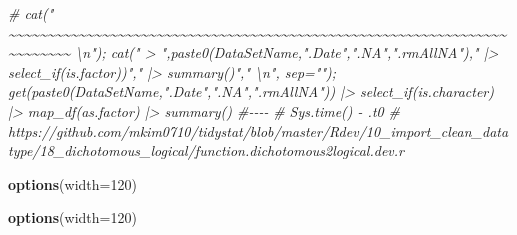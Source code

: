 \documentclass[
]{article}
\newenvironment{Shaded}{\begin{snugshade}}{\end{snugshade}}
\newcommand{\AttributeTok}[1]{\textcolor[rgb]{0.13,0.29,0.53}{#1}}
\newcommand{\CommentTok}[1]{\textcolor[rgb]{0.56,0.35,0.01}{\textit{#1}}}
\newcommand{\DecValTok}[1]{\textcolor[rgb]{0.00,0.00,0.81}{#1}}
\newcommand{\FunctionTok}[1]{\textcolor[rgb]{0.13,0.29,0.53}{\textbf{#1}}}
\newcommand{\NormalTok}[1]{#1}
\begin{document}
\begin{Shaded}
\begin{Highlighting}[]
\CommentTok{\# cat("    \textasciitilde{}\textasciitilde{}\textasciitilde{}\textasciitilde{}\textasciitilde{}\textasciitilde{}\textasciitilde{}\textasciitilde{}\textasciitilde{}\textasciitilde{}\textasciitilde{}\textasciitilde{}\textasciitilde{}\textasciitilde{}\textasciitilde{}\textasciitilde{}\textasciitilde{}\textasciitilde{}\textasciitilde{}\textasciitilde{}\textasciitilde{}\textasciitilde{}\textasciitilde{}\textasciitilde{}\textasciitilde{}\textasciitilde{}\textasciitilde{}\textasciitilde{}\textasciitilde{}\textasciitilde{}\textasciitilde{}\textasciitilde{}\textasciitilde{}\textasciitilde{}\textasciitilde{}\textasciitilde{}\textasciitilde{}\textasciitilde{}\textasciitilde{}\textasciitilde{}\textasciitilde{}\textasciitilde{}\textasciitilde{}\textasciitilde{}\textasciitilde{}\textasciitilde{}\textasciitilde{}\textasciitilde{}\textasciitilde{}\textasciitilde{}\textasciitilde{}\textasciitilde{}\textasciitilde{}\textasciitilde{}\textasciitilde{}\textasciitilde{}\textasciitilde{}\textasciitilde{}\textasciitilde{}\textasciitilde{}\textasciitilde{}\textasciitilde{}\textasciitilde{}\textasciitilde{}\textasciitilde{}\textasciitilde{}\textasciitilde{}\textasciitilde{}\textasciitilde{}\textasciitilde{}\textasciitilde{}\textasciitilde{}    \textbackslash{}n"); cat(" \textgreater{} ",paste0(DataSetName,".Date",".NA",".rmAllNA")," |\textgreater{} select\_if(is.factor))"," |\textgreater{} summary()","  \textbackslash{}n", sep=""); get(paste0(DataSetName,".Date",".NA",".rmAllNA")) |\textgreater{} select\_if(is.character) |\textgreater{} map\_df(as.factor) |\textgreater{} summary() \#{-}{-}{-}{-}  }
\CommentTok{\# Sys.time() {-} .t0}
\CommentTok{\# https://github.com/mkim0710/tidystat/blob/master/Rdev/10\_import\_clean\_datatype/18\_dichotomous\_logical/function.dichotomous2logical.dev.r}
\end{Highlighting}
\end{Shaded}

\begin{Shaded}
\begin{Highlighting}[]
\FunctionTok{options}\NormalTok{(}\AttributeTok{width=}\DecValTok{120}\NormalTok{)}
\end{Highlighting}
\end{Shaded}

\begin{Shaded}
\begin{Highlighting}[]
\FunctionTok{options}\NormalTok{(}\AttributeTok{width=}\DecValTok{120}\NormalTok{)}
\end{Highlighting}
\end{Shaded}
\end{document}
